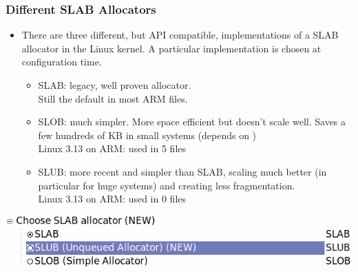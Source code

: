 \begin{frame}
  \frametitle{Different SLAB Allocators}
  \begin{itemize}
  \item There are three different, but API compatible, implementations of
    a SLAB allocator in the Linux kernel. A particular implementation
    is chosen at configuration time.
    \begin{itemize}
    \item SLAB: legacy, well proven allocator.\\
          Still the default in most ARM  files. 
    \item SLOB: much simpler. More space efficient but doesn't scale
      well. Saves a few hundreds of KB in small systems (depends on
      ) \\
      Linux 3.13 on ARM: used in 5  files 
    \item SLUB: more recent and simpler than
      SLAB, scaling much better (in particular for huge systems) and
      creating less fragmentation.\\
      Linux 3.13 on ARM: used in 0  files 
    \end{itemize}
  \end{itemize}
  \begin{center}
    \includegraphics[width=\textwidth]{slides/kernel-driver-development-memory/slab-screenshot.png}
  \end{center}
\end{frame}

